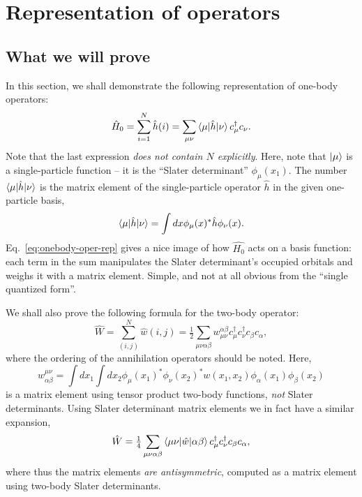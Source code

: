 \documentclass{report}
\theoremstyle{plain}
\theoremstyle{definition}
\begin{document}
\section{Representation of operators}

\subsection{What we will prove}


In this section, we shall demonstrate the following representation of
one-body operators:
\begin{equation}
  \hat{H}_0 = \sum_{i=1}^N \hat{h}(i) = \sum_{\mu\nu}
  \braket{\mu|\hat{h}|\nu} c^\dag_\mu
  c_\nu.\label{eq:onebody-operator-rep} 
\end{equation}
Note that the last expression \emph{does not contain $N$ explicitly}.
Here, note that $\ket{\mu}$ is a single-particle function -- it is the
``Slater determinant'' $\phi_\mu(x_1)$. The number
$\braket{\mu|\hat{h}|\nu}$ is the matrix element of the
single-particle operator $\hat{h}$ in the given one-particle basis,
\begin{equation}
  \braket{\mu|\hat{h}|\nu} = \int dx \phi_\mu(x)^* \hat{h}
  \phi_\nu(x).
\end{equation}
Eq.~\eqref{eq:onebody-oper-rep} gives a nice image of how
$\hat{H_0}$ acts on a basis function: each term in the sum manipulates
the Slater determinant's occupied orbitals and weighs it with a matrix
element. Simple, and not at all obvious from the ``single quantized
form''. 

We shall also prove the following formula for the two-body operator:
\begin{equation}
  \hat{W} = \sum_{(i,j)}^N \hat{w}(i,j) = \tfrac{1}{2} \sum_{\mu\nu\alpha\beta}
  w^{\alpha\beta}_{\mu\nu} c^\dag_\mu c^\dag_\nu
  c_\beta c_\alpha, \label{eq:twobody-operator-rep} 
\end{equation}
where the ordering of the annihilation operators should be
noted. Here,
\begin{equation}
  w^{\mu\nu}_{\alpha\beta} = \int
  dx_1\int dx_2 \phi_\mu(x_1)^*\phi_\nu(x_2)^* w(x_1,x_2)
  \phi_\alpha(x_1)\phi_\beta(x_2) \label{eq:twobody-matelem}
\end{equation}
is a matrix element using tensor product two-body functions,
\emph{not} Slater determinants. Using Slater determinant matrix
elements we in fact have a similar expansion,
\begin{equation}
  \hat{W} = \tfrac{1}{4} \sum_{\mu\nu\alpha\beta}
  \braket{\mu\nu|\hat{w}|\alpha\beta} c^\dag_\mu c^\dag_\nu
  c_\beta c_\alpha, \label{eq:twobody-operator-rep-as} 
\end{equation}
where thus the matrix elements \emph{are antisymmetric}, computed as a matrix
element using two-body Slater determinants.
\end{document}
